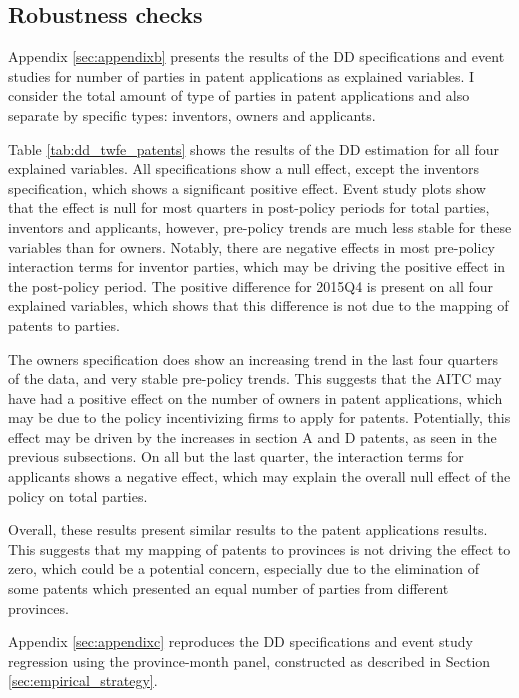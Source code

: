 \documentclass[../main.tex]{subfiles}
\begin{document}
\subsection{Robustness checks}

Appendix \ref{sec:appendixb} presents the results of the DD specifications and event studies for number of parties in patent applications as explained variables. I consider the total amount of type of parties in patent applications and also separate by specific types: inventors, owners and applicants. 

Table \ref{tab:dd_twfe_patents} shows the results of the DD estimation for all four explained variables. All specifications show a null effect, except the inventors specification, which shows a significant positive effect. Event study plots show that the effect is null for most quarters in post-policy periods for total parties, inventors and applicants, however, pre-policy trends are much less stable for these variables than for owners. Notably, there are negative effects in most pre-policy interaction terms for inventor parties, which may be driving the positive effect in the post-policy period. The positive difference for 2015Q4 is present on all four explained variables, which shows that this difference is not due to the mapping of patents to parties.

The owners specification does show an increasing trend in the last four quarters of the data, and very stable pre-policy trends. This suggests that the AITC may have had a positive effect on the number of owners in patent applications, which may be due to the policy incentivizing firms to apply for patents. Potentially, this effect may be driven by the increases in section A and D patents, as seen in the previous subsections. On all but the last quarter, the interaction terms for applicants shows a negative effect, which may explain the overall null effect of the policy on total parties.

Overall, these results present similar results to the patent applications results. This suggests that my mapping of patents to provinces is not driving the effect to zero, which could be a potential concern, especially due to the elimination of some patents which presented an equal number of parties from different provinces.

Appendix \ref{sec:appendixc} reproduces the DD specifications and event study regression using the province-month panel, constructed as described in Section \ref{sec:empirical_strategy}. 
\end{document}
